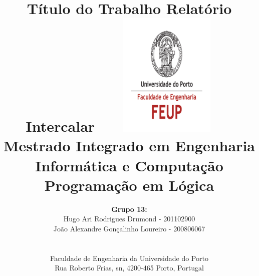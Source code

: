 \documentclass[a4paper]{article}
\begin{document}
\setlength{\textwidth}{16cm}
\setlength{\textheight}{22cm}

\title{\Huge\textbf{Título do Trabalho}\linebreak\linebreak\linebreak
\Large\textbf{Relatório Intercalar}\linebreak\linebreak
\includegraphics[height=6cm, width=7cm]{feup.pdf}\linebreak \linebreak
\Large{Mestrado Integrado em Engenharia Informática e Computação} \linebreak \linebreak
\Large{Programação em Lógica}\linebreak
}

\author{\textbf{Grupo 13:}\\ Hugo Ari Rodrigues Drumond - 201102900 \\ João Alexandre Gonçalinho Loureiro - 200806067 \\\linebreak\linebreak \\
 \\ Faculdade de Engenharia da Universidade do Porto \\ Rua Roberto Frias, s\/n, 4200-465 Porto, Portugal \linebreak\linebreak\linebreak
\linebreak\linebreak\vspace{1cm}}
\maketitle
\thispagestyle{empty}

\end{document}
